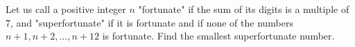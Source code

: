 Let us call a positive integer $n$ "fortunate" if the sum of its digits is a multiple of $7$, and "superfortunate" if it is fortunate and if none of the numbers $n+1,n+2,...,n+12$ is fortunate. Find the smallest superfortunate number.
